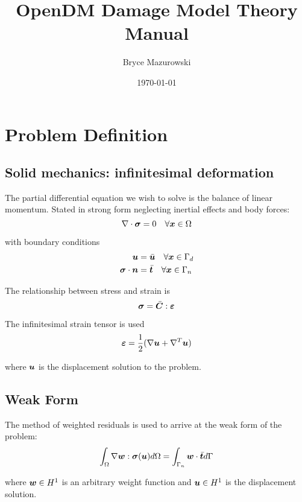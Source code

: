 \documentclass[11pt]{article}
\author{Bryce Mazurowski}
\date{\today}
\title{OpenDM Damage Model Theory Manual}
\begin{document}
\maketitle

\section{Problem Definition}
\label{sec:orgac83f4b}
\subsection{Solid mechanics: infinitesimal deformation}
\label{sec:orgfbe96c5}
The partial differential equation we wish to solve is the balance of
linear momentum. Stated in strong form neglecting inertial effects and
body forces:
\begin{equation}
  \nabla \cdot \bm{\sigma} = 0 \quad \forall \bm{x} \in \Omega
\end{equation}

with boundary conditions
\begin{equation}
  \begin{split}
    \bm{u} &= \bar{\bm{u}} \quad \forall \bm{x} \in \Gamma_d \\
    \bm{\sigma} \cdot \bm{n} &= \bar{\bm{t}}
    \quad \forall \bm{x} \in \Gamma_n \\
  \end{split}
\end{equation}

The relationship between stress and strain is
\begin{equation}
  \bm{\sigma} = \bar{\bm{C}} : \bm{\varepsilon}
\end{equation}

The infinitesimal strain tensor is used
\[
\bm{\varepsilon} = \frac{1}{2}(\nabla \bm{u} + \nabla^T \bm{u})
\]

where \(\bm{u}\) is the displacement solution to the problem.
\subsection{Weak Form}
\label{sec:org5ca83d9}
The method of weighted residuals is used to arrive at the weak form of
the problem:
\begin{equation}
  \int_{\Omega} \nabla \bm{w} : \bm{\sigma} (\bm{u}) d\Omega =
  \int_{\Gamma_n} \bm{w} \cdot \bar{\bm{t}} d\Gamma
\end{equation}

where \(\bm{w} \in H^1\) is an arbitrary weight function and
\(\bm{u} \in H^1\) is the displacement solution.
\end{document}
